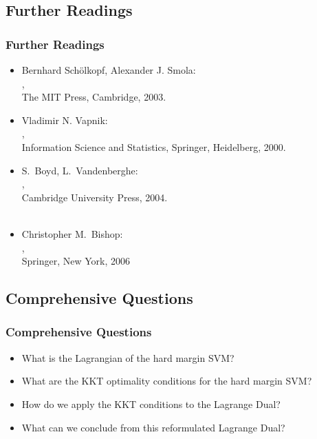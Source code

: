 

\subsection{Further Readings}

\begin{frame}
  \frametitle{Further Readings}
  
  \begin{itemize}
    \item Bernhard Sch{\"o}lkopf, Alexander J. Smola: \\
      , \\
      The MIT Press, Cambridge, 2003. \\[.15cm]
    \item Vladimir N. Vapnik: \\
      , \\
      Information Science and Statistics, Springer, Heidelberg, 2000. \\[.15cm]
    \item S.~Boyd, L.~Vandenberghe: \\
      , \\
      Cambridge University Press, 2004. \\
       \\[.15cm]
    \item Christopher M.\ Bishop: \\
      , \\ 
      Springer, New York, 2006
  \end{itemize}
\end{frame}


\subsection{Comprehensive Questions}

\begin{frame}
  \frametitle{Comprehensive Questions}

  \begin{itemize}
    \item What is the Lagrangian of the hard margin SVM? \\[1cm]
    \item What are the KKT optimality conditions for the hard margin SVM? \\[1cm]
    \item How do we apply the KKT conditions to the Lagrange Dual? \\[1cm]
    \item What can we conclude from this reformulated Lagrange Dual?
  \end{itemize}
\end{frame}
